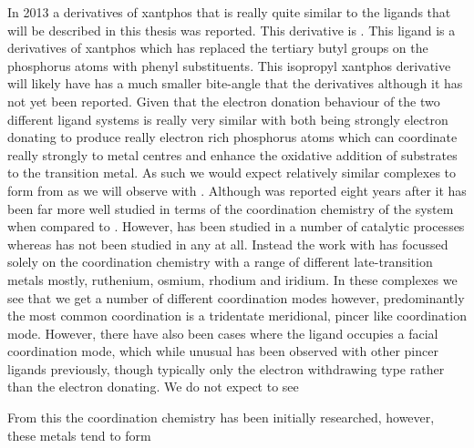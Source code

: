 In 2013 a derivatives of xantphos that is really quite similar to the \tBuxantphos{} ligands that will be described in this thesis was reported.  This derivative is \iPrxantphos.  This ligand is a derivatives of xantphos which has replaced the tertiary butyl groups on the phosphorus atoms with phenyl substituents.  This isopropyl xantphos derivative will likely have  has a much smaller bite-angle that the \tBuxantphos{} derivatives although it has not yet been reported.  Given that the electron donation behaviour of the two different ligand systems is really very similar with both being strongly electron donating to produce really electron rich phosphorus atoms which can coordinate really strongly to metal centres and enhance the oxidative addition of substrates to the transition metal.  As such we would expect relatively similar  complexes to form from \iPrxantphos{} as we will observe with \tBuxantphos{}.  Although \iPrxantphos was reported eight years after \tBuxantphos{} it has been far more well studied in terms of the coordination chemistry of the system when compared to \tBuxantphos{}.  However, \tBuxantphos{} has been studied in a number of catalytic processes whereas \iPrxantphos{}  has not been studied in any at all.  Instead the work with \iPrxantphos{} has focussed solely on the coordination chemistry with a range of different late-transition metals mostly, ruthenium, osmium, rhodium and iridium.  In these complexes we see that we get a number of different coordination modes however, predominantly the most common coordination is a tridentate meridional, pincer like coordination mode.  However, there have also been cases where the ligand occupies a facial coordination mode, which while unusual has been observed with other pincer ligands previously, though typically only the electron withdrawing type rather than the electron donating.  We do not expect to see 

From this the coordination chemistry has been initially researched, however, these metals tend to form 

